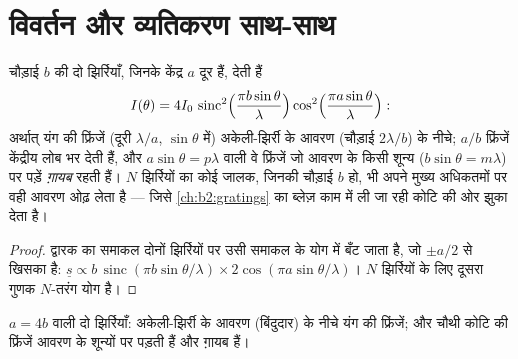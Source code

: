 \section{विवर्तन और व्यतिकरण साथ-साथ}

\begin{proposition}[परिमित चौड़ाई की यंग की झिर्रियाँ; जालक का आवरण]\label{prop:b2:diffraction:combined}
चौड़ाई $b$ की दो झिर्रियाँ, जिनके केंद्र $a$ दूर हैं, देती हैं
\[
I(\theta) = 4I_0\,\operatorname{sinc}^2\Bigl(\frac{\pi b\sin\theta}\lambda\Bigr)\cos^2\Bigl(\frac{\pi a\sin\theta}\lambda\Bigr) :
\]
अर्थात् यंग की फ्रिंजें (दूरी $\lambda/a$, $\sin\theta$ में) अकेली-झिर्री के आवरण
(चौड़ाई $2\lambda/b$) के नीचे; $a/b$ फ्रिंजें केंद्रीय लोब भर देती हैं, और
$a\sin\theta = p\lambda$ वाली वे फ्रिंजें जो आवरण के किसी शून्य
($b\sin\theta = m\lambda$) पर पड़ें \emph{ग़ायब} रहती हैं। $N$ झिर्रियों का कोई जालक,
जिनकी चौड़ाई $b$ हो, भी अपने मुख्य अधिकतमों पर वही आवरण ओढ़ लेता है ---
जिसे \cref{ch:b2:gratings} का ब्लेज़ काम में ली जा रही कोटि की ओर झुका देता है।
\end{proposition}

\begin{proof}
द्वारक का समाकल दोनों झिर्रियों पर उसी समाकल के योग में बँट जाता है,
जो $\pm a/2$ से खिसका है: $\underline s \propto b\,\operatorname{sinc}(\pi b\sin\theta/\lambda)
\times2\cos(\pi a\sin\theta/\lambda)$। $N$ झिर्रियों के लिए दूसरा गुणक
$N$-तरंग योग है।
\end{proof}

\begin{omfigure}

{\small $a = 4b$ वाली दो झिर्रियाँ: अकेली-झिर्री के आवरण (बिंदुदार) के नीचे
यंग की फ्रिंजें; और चौथी कोटि की फ्रिंजें आवरण के शून्यों पर
पड़ती हैं और ग़ायब हैं।}
\end{omfigure}


